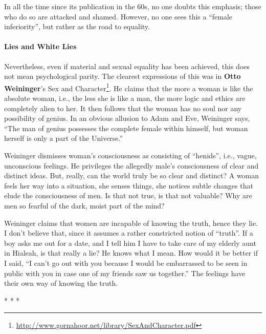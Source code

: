 In all the time since its publication in the 60s, no one doubts this emphasis; those who do so are attacked and shamed. However, no one sees this a ``female inferiority'', but rather as the road to equality.

\paragraph{Lies and White Lies}


Nevertheless, even if material and sexual equality has been achieved, this does not mean psychological parity. The clearest expressions of this was in \textbf{Otto Weininger}'s Sex and Character\footnote{\url{http://www.gornahoor.net/library/SexAndCharacter.pdf}}. He claims that the more a woman is like the absolute woman, i.e., the less she is like a man, the more logic and ethics are completely alien to her. It then follows that the woman has no soul nor any possibility of genius. In an obvious allusion to Adam and Eve, Weininger says, ``The man of genius possesses the complete female within himself, but woman herself is only a part of the Universe.''

Weininger dismisses woman's consciousness as consisting of ``henids'', i.e., vague, unconscious feelings. He privileges the allegedly male's consciousness of clear and distinct ideas. But, really, can the world truly be so clear and distinct? A woman feels her way into a situation, she senses things, she notices subtle changes that elude the consciousness of men. Is that not true, is that not valuable? Why are men so fearful of the dark, moist part of the mind?

Weininger claims that women are incapable of knowing the truth, hence they lie. I don't believe that, since it assumes a rather constricted notion of ``truth''. If a boy asks me out for a date, and I tell him I have to take care of my elderly aunt in Hialeah, is that really a lie? He knows what I mean. How would it be better if I said, ``I can't go out with you because I would be embarrassed to be seen in public with you in case one of my friends saw us together.'' The feelings have their own way of knowing the truth.



\begin{center}* * *\end{center}

